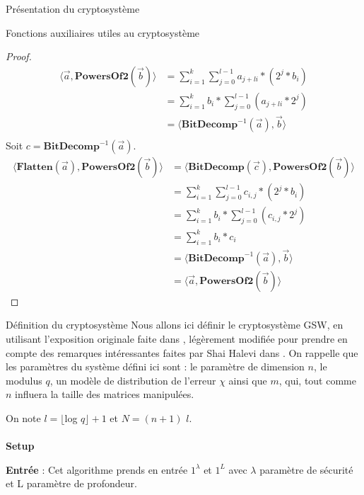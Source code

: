 \begin{section}{Présentation du cryptosystème}
\begin{subsection}{Fonctions auxiliaires utiles au cryptosystème}
	\begin{proof}
	\begin{align*}
	\langle \vec{a}, \textbf{PowersOf2}(\vec{b}) \rangle &= \sum\limits_{i=1}^{k} \sum\limits_{j=0}^{l-1} a_{j+li} * (2^{j} * b_i) \\
	&= \sum\limits_{i=1}^{k} b_i * \sum\limits_{j=0}^{l-1} (a_{j+li} * 2^{j}) \\
	&= \langle \textbf{BitDecomp}^{-1}(\vec{a}), \vec{b}\rangle \\
	\end{align*}
	Soit $c = \textbf{BitDecomp}^{-1}(\vec{a})$.
	\begin{align*}
	\langle \textbf{Flatten}(\vec{a}),\textbf{PowersOf2}(\vec{b}) \rangle &= \langle \textbf{BitDecomp}(\vec{c}),\textbf{PowersOf2}(\vec{b}) \rangle \\
	&= \sum\limits_{i=1}^{k} \sum\limits_{j=0}^{l-1} c_{i,j} * (2^{j} * b_i) \\
	&= \sum\limits_{i=1}^{k} b_i * \sum\limits_{j=0}^{l-1} (c_{i,j} * 2^{j}) \\
	&= \sum\limits_{i=1}^{k} b_i * c_i \\
	&= \langle \textbf{BitDecomp}^{-1}(\vec{a}), \vec{b}\rangle \\
	&= \langle \vec{a}, \textbf{PowersOf2}(\vec{b}) \rangle
	\end{align*}
	\end{proof}
	
	\end{subsection}
	\begin{subsection}{Définition du cryptosystème}
	Nous allons ici définir le cryptosystème GSW, en utilisant l'exposition originale faite dans \cite{EPRINT:GenSahWat13}, légèrement modifiée pour prendre en compte des remarques intéressantes faites par Shai Halevi dans \cite{halevi}.
	On rappelle que les paramètres du système défini ici sont : le paramètre de dimension $n$, le modulus $q$, un modèle de distribution de l'erreur $\chi$ ainsi que $m$, qui, tout comme $n$ influera la taille des matrices manipulées.

	On note $l = \lfloor$log $q\rfloor + 1$ et $N = (n + 1)$ $l$.
		
	\paragraph{}
	\textbf{Setup}
	\flushleft

	\textbf{Entrée} : Cet algorithme prends en entrée $1^\lambda$ et $1^L$ avec $\lambda$ paramètre de sécurité et L paramètre de profondeur.


\end{subsection}
\end{section}
